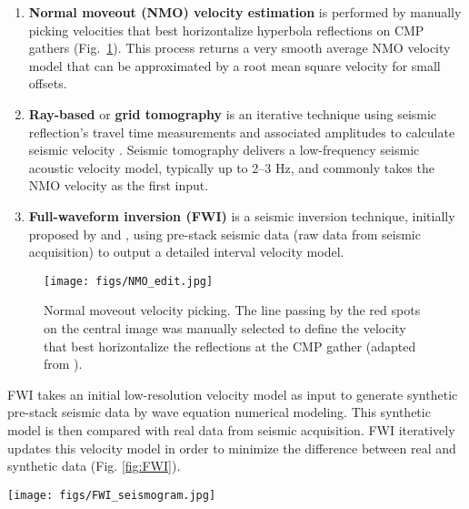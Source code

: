\documentclass[conference]{IEEEtran}
\begin{document}
\begin{enumerate}

\item\textbf{Normal moveout (NMO) velocity estimation} is performed by manually picking  velocities that best horizontalize hyperbola reflections on CMP gathers (Fig.~\ref{fig:NMO}). This process returns a very smooth average NMO velocity model that can be approximated by a root mean square velocity for small offsets. 

\item\textbf{Ray-based} or \textbf{grid tomography} is an iterative technique using seismic reflection's travel time measurements and associated amplitudes to calculate seismic velocity \cite{Jones2010TutorialVE}. Seismic tomography delivers a low-frequency seismic acoustic velocity model, typically up to  2–3 Hz, and commonly takes the NMO velocity as the first input.

\item\textbf{Full-waveform inversion (FWI)} is a seismic inversion technique, initially proposed by \cite{lailly1983sequence} and \cite{Tarantola1984InversionOS}, using pre-stack seismic data (raw data from seismic acquisition) to output a detailed interval velocity model.

\end{enumerate}
\begin{figure}[b]
 \centering
 \texttt{[image: figs/NMO\_edit.jpg]}
  \caption{Normal moveout velocity picking. The line passing by the red spots on the central image was manually selected to define the velocity that best horizontalize the reflections at the CMP gather (adapted from \cite{Madagascar}). }
 \label{fig:NMO}
\end{figure}

FWI takes an initial low-resolution velocity model as input to generate synthetic pre-stack seismic data by wave equation numerical modeling. This synthetic model is then compared with real data from seismic acquisition. FWI iteratively updates this velocity model in order to minimize the difference between real and synthetic data (Fig. \ref{fig:FWI}).

\begin{figure*}[t]
 \centering
 \texttt{[image: figs/FWI\_seismogram.jpg]}
  \caption{FWI modeling: a) Real seismogram compared with synthetic seismogram generated from the initial velocity model and b) Real seismogram compared with synthetic seismogram generated from the final velocity model (From \cite{virieux2017introduction}). }
 \label{fig:FWI}
\end{figure*}
\end{document}
